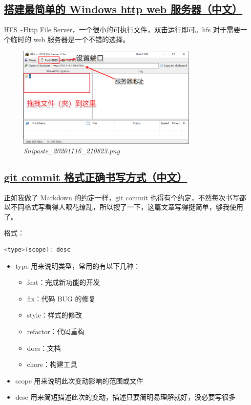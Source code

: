 \subsection{\href{https://blog.csdn.net/Cinderella___/article/details/88697062}{搭建最简单的 Windows http web 服务器（中文）}}

\href{http://www.rejetto.com/hfs/?f=dl}{HFS \textasciitilde Http File Server}，一个很小的可执行文件，双击运行即可。hfs 对于需要一个临时的 web 服务器是一个不错的选择。

\begin{figure}[htbp]
  \centering
    \includegraphics[width=0.8\textwidth]{../images/2020/11/Snipaste_20201116_210823.png}
  \caption{\textit{Snipaste\_20201116\_210823.png}}
\end{figure}

\subsection{\href{https://www.jianshu.com/p/7f4572b88c84}{git commit 格式正确书写方式（中文）}}

正如我做了 Markdown 的约定一样，git commit 也得有个约定，不然每次书写都以不同格式写看得人眼花缭乱，所以搜了一下，这篇文章写得挺简单，够我使用了。

格式：

\begin{lstlisting}[language=Bash]
<type>(scope): desc
\end{lstlisting}

\begin{itemize}
\item type 用来说明类型，常用的有以下几种：
  \begin{itemize}
    \item feat：完成新功能的开发
    \item fix：代码 BUG 的修复
    \item style：样式的修改
    \item refactor：代码重构
    \item docs：文档
    \item chore：构建工具
  \end{itemize}
\item scope 用来说明此次变动影响的范围或文件
\item desc 用来简短描述此次的变动，描述只要简明易理解就好，没必要写很多
\end{itemize}

